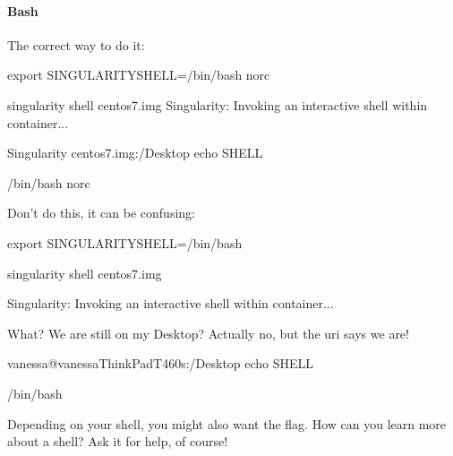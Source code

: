 \documentclass[letterpaper,10pt,english]{sphinxmanual}
\begin{document}
\paragraph{Bash}
\label{\detokenize{appendix:bash}}
The correct way to do it:

%
\begin{sphinxVerbatim}[commandchars=\\\{\}]
export SINGULARITY\PYGZus{}SHELL=\PYGZdq{}/bin/bash \PYGZhy{}\PYGZhy{}norc\PYGZdq{}

singularity shell centos7.img Singularity: Invoking an interactive shell within container...

Singularity centos7.img:\PYGZti{}/Desktop\PYGZgt{} echo \PYGZdl{}SHELL

/bin/bash \PYGZhy{}\PYGZhy{}norc
\end{sphinxVerbatim}

Don’t do this, it can be confusing:

%
\begin{sphinxVerbatim}[commandchars=\\\{\}]
\PYGZdl{} export SINGULARITY\PYGZus{}SHELL=/bin/bash

\PYGZdl{} singularity shell centos7.img

Singularity: Invoking an interactive shell within container...


\PYGZsh{} What? We are still on my Desktop? Actually no, but the uri says we are!

vanessa@vanessa\PYGZhy{}ThinkPad\PYGZhy{}T460s:\PYGZti{}/Desktop\PYGZdl{} echo \PYGZdl{}SHELL

/bin/bash
\end{sphinxVerbatim}

Depending on your shell, you might also want the  flag. How can you learn
more about a shell? Ask it for help, of course!
\end{document}
